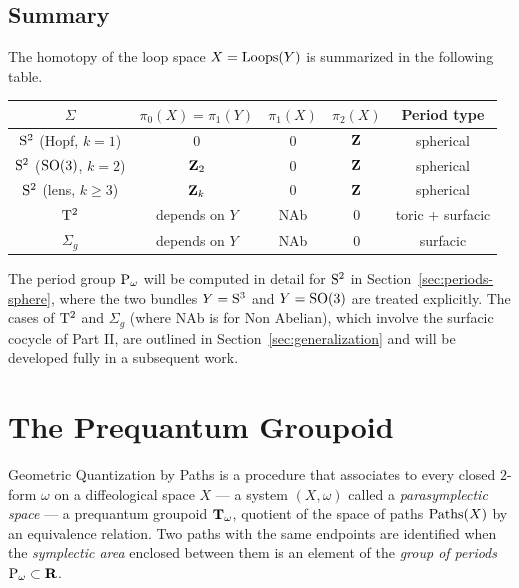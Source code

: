 \documentclass[11pt,reqno,letterpaper,twoside]{amsart}
\renewcommand{\TT}{\Groupoid{T}}
\begin{document}
  \subsection{Summary}
  
  The homotopy of the loop space $X = \operatorname{Loops}(Y)$ is summarized in the following table.
  
  \begin{center}
    \begin{tabular}{|c|c|c|c|c|}
      \hline
      $\Sigma$ & $\pi_0(X) = \pi_1(Y)$ & $\pi_1(X)$ & $\pi_2(X)$ & Period type \\
      \hline
      $\mathrm{S}^2$ (Hopf, $k=1$) & $0$ & $0$ & ${\mathbf{Z}}$ & spherical \\
      $\mathrm{S}^2$ ($\mathrm{SO}(3)$, $k=2$) & ${\mathbf{Z}}_2$ & $0$ & ${\mathbf{Z}}$ & spherical \\
      $\mathrm{S}^2$ (lens, $k \geq 3$) & ${\mathbf{Z}}_k$ & $0$ & ${\mathbf{Z}}$ & spherical \\
      $\mathrm{T}^2$ & depends on $Y$ & NAb & $0$ & toric + surfacic \\
      $\Sigma_g$ & depends on $Y$ & NAb & $0$ & surfacic \\
      \hline
    \end{tabular}
  \end{center}
  
  The period group $\operatorname{P}_\omega$ will be computed in detail
  for $\mathrm{S}^2$ in Section~\ref{sec:periods-sphere},
  where the two bundles $Y = \mathrm{S}^3$ and $Y = \mathrm{SO}(3)$
  are treated explicitly.
  The cases of $\mathrm{T}^2$ and $\Sigma_g$ (where NAb is for Non Abelian),
  which involve the surfacic cocycle of Part II,
  are outlined in Section~\ref{sec:generalization}
  and will be developed fully in a subsequent work.
  
  \section{The Prequantum Groupoid}
  
  Geometric Quantization by Paths is a procedure that associates to every closed $2$-form $\omega$ on a diffeological space $X$
  --- a system $(X,\omega)$ called a \emph{parasymplectic space} ---
  a prequantum groupoid $\TT_\omega$,
  quotient of the space of paths $\operatorname{Paths}(X)$ by an equivalence relation.
  Two paths with the same endpoints are identified when the \emph{symplectic area} enclosed between them
  is an element of the \emph{group of periods} $\operatorname{P}_\omega \subset {\mathbf{R}}$.
  
\end{document}
